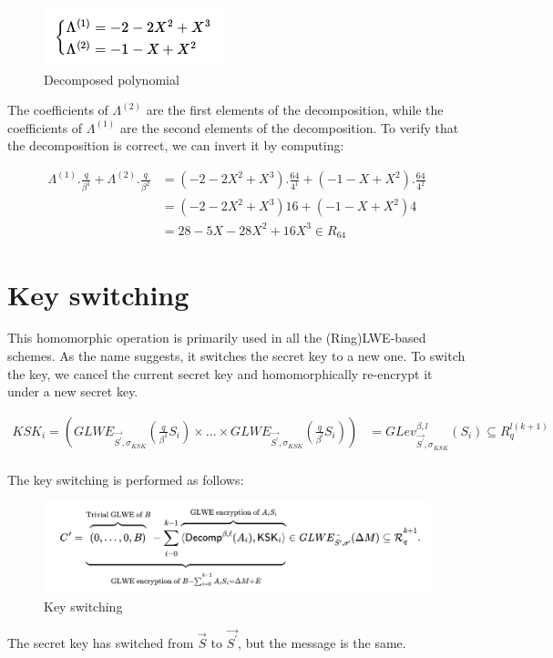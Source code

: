 \documentclass{techrep}
\theoremstyle{definition}
\theoremstyle{plain}
\begin{document}
	\begin{figure}[H]
		\centering
	\includegraphics[width=.4\columnwidth]{fig/decomp_poly.png}
		\caption{Decomposed polynomial}
		\label{fig:decomposed_polyn}
	\end{figure}

The coefficients of $\Lambda^{(2)}$ are the first elements of the decomposition, while the coefficients of $\Lambda^{(1)}$ are the second elements of the decomposition. To verify that the decomposition is correct, we can invert it by computing:

	\begin{align*}
\Lambda^{(1)}.\frac{q}{\beta^1}	+ \Lambda^{(2)}.\frac{q}{\beta^2}	&=	  (-2-2X^2+X^3).\frac{64}{4^1}	+ (-1-X+X^2).\frac{64}{4^2} \\
 &= (-2-2X^2+X^3)16	+ (-1-X+X^2)4 \\
                 &= 28 - 5X - 28X^2+16X^3 \in R_{64}
	\end{align*}


\section{Key switching}
This homomorphic operation is primarily used in all the (Ring)LWE-based schemes. As the name suggests, it switches the secret key to a new one. To switch the key, we cancel the current secret key and homomorphically re-encrypt it under a new secret key. 

		\begin{align*}
{KSK}_i = (GLWE_{\overrightarrow{S^{'}},\sigma_{KSK}}(\frac{q}{\beta^1} S_i) \times ... \times GLWE_{\overrightarrow{S^{'}},\sigma_{KSK}}(\frac{q}{\beta^l} S_i))	&=	{GLev}_{\overrightarrow{S^{'}}, \sigma_{KSK}}^{\beta, l}(S_i)  \subseteq  R_{q}^{l{(k+1)}}  \\
	\end{align*}
	

The key switching is performed as follows:

	\begin{figure}[H]
		\centering
	\includegraphics[width=1\columnwidth]{fig/ksk.png}
		\caption{Key switching}
		\label{fig:ksk}
	\end{figure}

The secret key has switched from $\overrightarrow{S}$ to $\overrightarrow{S^{'}}$, but the message is the same.
\end{document}
